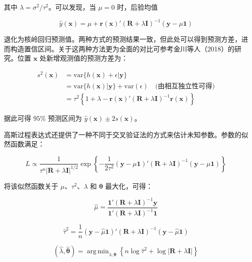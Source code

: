 \documentclass{ctexart}
\DeclareMathOperator*{\argmin}{arg\,min}
\begin{document}
其中 $\lambda=\sigma^2/\tau^2$。可以发现，当 $\mu=0$ 时，后验均值

\begin{equation*}
\widehat{y}(\boldsymbol{x})=\mu+\boldsymbol{r}(\boldsymbol{x})'(\boldsymbol{R}+\lambda\boldsymbol{I})^{-1}(\boldsymbol{y}-\mu\boldsymbol{1})
\end{equation*}

退化为核岭回归预测值。两种方式的预测结果一致，但此处可以得到预测方差，进而构造置信区间。关于这两种方法更为全面的对比可参考金川等人（2018）的研究。位置 $\boldsymbol{x}$ 处新增观测值的预测方差为：

\begin{align*}
s^2(\boldsymbol{x})&=\mathrm{var}\{h(\boldsymbol{x})+\epsilon|\boldsymbol{y}\}\\
&=\mathrm{var}\{h(\boldsymbol{x})|\boldsymbol{y}\}+\mathrm{var}(\epsilon)\quad\text{(由相互独立性可得)}\\
&=\tau^2\left\{1+\lambda-\boldsymbol{r}(\boldsymbol{x})'(\boldsymbol{R}+\lambda\boldsymbol{I})^{-1}\boldsymbol{r}(\boldsymbol{x})\right\}
\end{align*}

据此可得 $95\%$ 预测区间为 $\widehat{y}(\boldsymbol{x})\pm2s(\boldsymbol{x})$。

高斯过程表达式还提供了一种不同于交叉验证法的方式来估计未知参数。参数的似然函数满足：

\begin{equation*}
L\propto\frac{1}{\tau^n |\boldsymbol{R}+\lambda\boldsymbol{I}|^{1/2}}\exp\left\{-\frac{1}{2\tau^2}(\boldsymbol{y}-\mu\boldsymbol{1})'(\boldsymbol{R}+\lambda\boldsymbol{I})^{-1}(\boldsymbol{y}-\mu\boldsymbol{1})\right\}
\end{equation*}

将该似然函数关于 $\mu$、$\tau^2$、$\lambda$ 和 $\boldsymbol{\theta}$ 最大化，可得：

\begin{equation*}
\widehat{\mu}=\frac{\boldsymbol{1}'(\boldsymbol{R}+\lambda\boldsymbol{I})^{-1}\boldsymbol{y}}{\boldsymbol{1}'(\boldsymbol{R}+\lambda\boldsymbol{I})^{-1}\boldsymbol{1}}\tag{2.44}
\end{equation*}

\begin{equation*}
\widehat{\tau}^2=\frac{1}{n}(\boldsymbol{y}-\widehat{\mu}\boldsymbol{1})'(\boldsymbol{R}+\lambda\boldsymbol{I})^{-1}(\boldsymbol{y}-\widehat{\mu}\boldsymbol{1})\tag{2.45}
\end{equation*}

\begin{equation*}
(\widehat{\lambda},\widehat{\boldsymbol{\theta}})=\argmin_{\lambda,\boldsymbol{\theta}}\left\{n\log\widehat{\tau}^2+\log|\boldsymbol{R}+\lambda\boldsymbol{I}|\right\}\tag{2.46}
\end{equation*}
\end{document}
